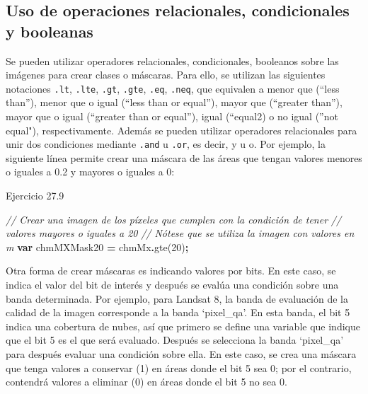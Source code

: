 \documentclass[
  12pt,
  letterpaper,
  twoside]{book}
\newenvironment{Shaded}{\begin{snugshade}}{\end{snugshade}}
\newcommand{\CommentTok}[1]{\textcolor[rgb]{0.56,0.35,0.01}{\textit{#1}}}
\newcommand{\DecValTok}[1]{\textcolor[rgb]{0.00,0.00,0.81}{#1}}
\newcommand{\FunctionTok}[1]{\textcolor[rgb]{0.00,0.00,0.00}{#1}}
\newcommand{\KeywordTok}[1]{\textcolor[rgb]{0.13,0.29,0.53}{\textbf{#1}}}
\newcommand{\NormalTok}[1]{#1}
\newcommand{\OperatorTok}[1]{\textcolor[rgb]{0.81,0.36,0.00}{\textbf{#1}}}
\begin{document}
\hypertarget{uso-de-operaciones-relacionales-condicionales-y-booleanas}{%
\subsection{Uso de operaciones relacionales, condicionales y booleanas}\label{uso-de-operaciones-relacionales-condicionales-y-booleanas}}

Se pueden utilizar operadores relacionales, condicionales, booleanos sobre las imágenes para crear clases o máscaras. Para ello, se utilizan las siguientes notaciones \texttt{.lt}, \texttt{.lte}, \texttt{.gt}, \texttt{.gte}, \texttt{.eq}, \texttt{.neq}, que equivalen a menor que (``less than''), menor que o igual (``less than or equal''), mayor que (``greater than''), mayor que o igual (``greater than or equal''), igual (``equal2) o no igual (''not equal"), respectivamente. Además se pueden utilizar operadores relacionales para unir dos condiciones mediante \texttt{.and} u \texttt{.or}, es decir, y u o. Por ejemplo, la siguiente línea permite crear una máscara de las áreas que tengan valores menores o iguales a 0.2 y mayores o iguales a 0:

Ejercicio 27.9

\begin{Shaded}
\begin{Highlighting}[]
\CommentTok{// Crear una imagen de los píxeles que cumplen con la condición de tener }
\CommentTok{// valores mayores o iguales a 20}
\CommentTok{// Nótese que se utiliza la imagen con valores en m}
\KeywordTok{var}\NormalTok{ chmMXMask20 }\OperatorTok{=}\NormalTok{ chmMx}\OperatorTok{.}\FunctionTok{gte}\NormalTok{(}\DecValTok{20}\NormalTok{)}\OperatorTok{;}
\end{Highlighting}
\end{Shaded}

Otra forma de crear máscaras es indicando valores por bits. En este caso, se indica el valor del bit de interés y después se evalúa una condición sobre una banda determinada. Por ejemplo, para Landsat 8, la banda de evaluación de la calidad de la imagen corresponde a la banda `pixel\_qa'. En esta banda, el bit 5 indica una cobertura de nubes, así que primero se define una variable que indique que el bit 5 es el que será evaluado. Después se selecciona la banda `pixel\_qa' para después evaluar una condición sobre ella. En este caso, se crea una máscara que tenga valores a conservar (1) en áreas donde el bit 5 sea 0; por el contrario, contendrá valores a eliminar (0) en áreas donde el bit 5 no sea 0.
\end{document}
